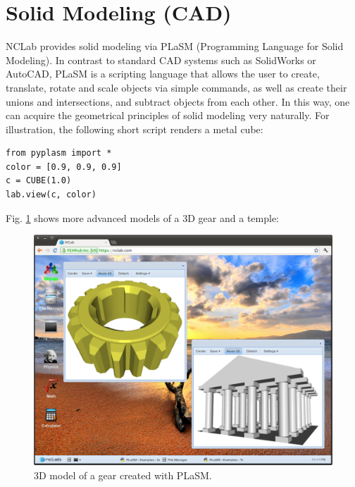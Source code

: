 \documentclass[article,A4,12pt]{llncs}
\begin{document}
\section{Solid Modeling (CAD)}

NCLab provides solid modeling via PLaSM (Programming Language for Solid Modeling). In contrast to standard
CAD systems such as SolidWorks or AutoCAD, PLaSM is a scripting language that 
allows the user to create, translate, rotate and scale objects via simple commands, 
as well as create their unions and intersections, and subtract objects from each other.  
In this way, one can acquire the geometrical principles of solid modeling very naturally.
For illustration, the following short script renders a metal cube:
\newpage
\begin{verbatim}
from pyplasm import *
color = [0.9, 0.9, 0.9]
c = CUBE(1.0)
lab.view(c, color)
\end{verbatim}
Fig. \ref{fig:plasm1} shows more advanced models of a 3D gear and 
a temple:

\begin{figure}[!ht]
\begin{center}
\includegraphics[width=\textwidth]{img/plasm1.png}
\end{center}
\caption{3D model of a gear created with PLaSM.}
\label{fig:plasm1}
\end{figure}
\end{document}
